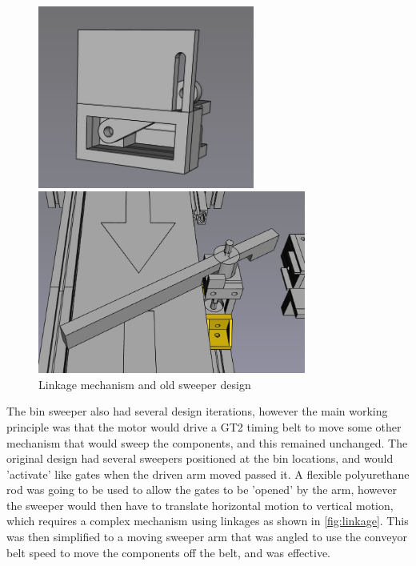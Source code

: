  \begin{figure}[H]
    \centering
    \begin{minipage}[t]{0.49\textwidth}
        \centering
        \includegraphics[height=6cm]{imgs/freecad/2024-05-14_22-32-02_FreeCADLink.jpg}
    \end{minipage}
    \hfill
    \begin{minipage}[t]{0.49\textwidth}
        \centering
        \includegraphics[height=6cm]{imgs/freecad/2024-05-13_17-56-29_FreeCADLink.jpg}
    \end{minipage}
    \caption{Linkage mechanism and old sweeper design}
    \label{fig:linkage}
  \end{figure}

 The bin sweeper also had several design iterations, however the main working principle was that the motor would drive a GT2 timing belt to move some other mechanism that would sweep the components, and this remained unchanged. The original design had several sweepers positioned at the bin locations, and would 'activate' like gates when the driven arm moved passed it. A flexible polyurethane rod was going to be used to allow the gates to be 'opened' by the arm, however the sweeper would then have to translate horizontal motion to vertical motion, which requires a complex mechanism using linkages as shown in \autoref{fig:linkage}. This was then simplified to a moving sweeper arm that was angled to use the conveyor belt speed to move the components off the belt, and was effective.
 
